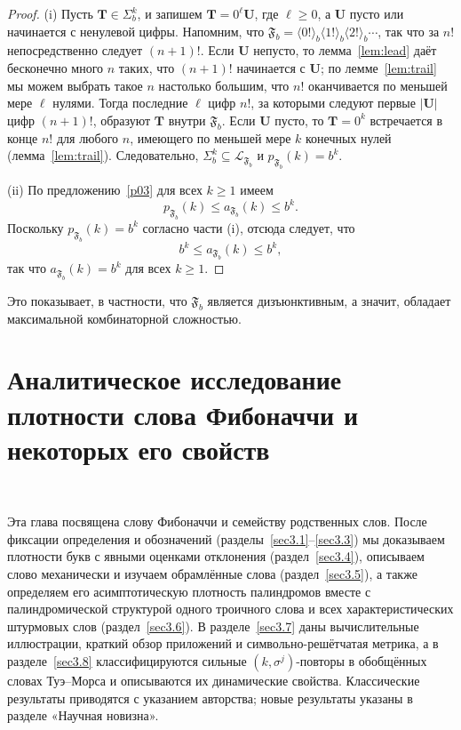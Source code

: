 \documentclass[a4paper,14pt]{extreport}
\theoremstyle{plain}
\theoremstyle{definition}
\theoremstyle{remark}
\begin{document}
\begin{proof}
	(i) Пусть $\mathbf T\in\Sigma_b^k$, и запишем $\mathbf T=0^{\ell}\mathbf U$, где $\ell\ge0$, а $\mathbf U$ пусто или начинается с ненулевой цифры.
	Напомним, что $\mathfrak F_b=\langle0!\rangle_b\langle1!\rangle_b\langle2!\rangle_b\cdots$, так что за $n!$ непосредственно следует $(n+1)!$.
	Если $\mathbf U$ непусто, то лемма~\ref{lem:lead} даёт бесконечно много $n$ таких, что $(n+1)!$ начинается с $\mathbf U$; по лемме~\ref{lem:trail} мы можем выбрать такое $n$ настолько большим, что $n!$ оканчивается по меньшей мере $\ell$ нулями. Тогда последние $\ell$ цифр $n!$, за которыми следуют первые $|\mathbf U|$ цифр $(n+1)!$, образуют $\mathbf T$ внутри $\mathfrak F_b$.
	Если $\mathbf U$ пусто, то $\mathbf T=0^k$ встречается в конце $n!$ для любого $n$, имеющего по меньшей мере $k$ конечных нулей (лемма~\ref{lem:trail}).
	Следовательно, $\Sigma_b^k\subseteq\mathcal L_{\mathfrak F_b}$ и $p_{\mathfrak F_b}(k)=b^k$. 
	
	(ii) По предложению~\ref{p03} для всех $k \geq 1$ имеем
	\begin{equation}
		p_{\mathfrak{F}_{b}}(k) \leq a_{\mathfrak{F}_{b}}(k) \leq b^{k}.
	\end{equation}
	Поскольку $p_{\mathfrak{F}_{b}}(k) = b^{k}$ согласно части (i), отсюда следует, что
	\begin{equation}
		b^{k} \leq a_{\mathfrak{F}_{b}}(k) \leq b^{k},
	\end{equation}
	так что $a_{\mathfrak{F}_{b}}(k) = b^{k}$ для всех $k \geq 1$.
\end{proof}
Это показывает, в частности, что $\mathfrak{F}_{b}$ является дизъюнктивным, а значит, обладает максимальной комбинаторной сложностью.
\chapter{Аналитическое исследование плотности слова Фибоначчи и некоторых его свойств}~\label{sec3}

Эта глава посвящена слову Фибоначчи и семейству родственных слов. После фиксации определения и обозначений (разделы~\ref{sec3.1}--\ref{sec3.3}) мы доказываем плотности букв с явными оценками отклонения (раздел~\ref{sec3.4}), описываем слово механически и изучаем обрамлённые слова (раздел~\ref{sec3.5}), а также определяем его асимптотическую плотность палиндромов вместе с палиндромической структурой одного троичного слова и всех характеристических штурмовых слов (раздел~\ref{sec3.6}). В разделе~\ref{sec3.7} даны вычислительные иллюстрации, краткий обзор приложений и символьно-решётчатая метрика, а в разделе~\ref{sec3.8} классифицируются сильные $(k,\sigma^j)$-повторы в обобщённых словах Туэ--Морса и описываются их динамические свойства. Классические результаты приводятся с указанием авторства; новые результаты указаны в разделе «Научная новизна».
\end{document}
